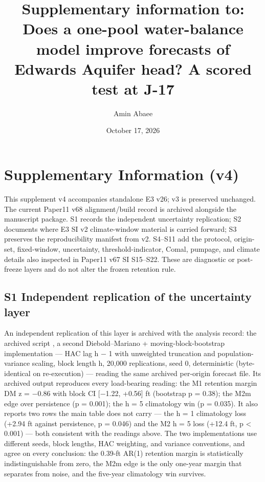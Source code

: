 \documentclass[11pt]{article}
\title{Supplementary information to: Does a one-pool water-balance model improve forecasts of Edwards Aquifer head? A scored test at J-17}
\author{Amin Abaee}
\date{October 17, 2026}
\begin{document}
\maketitle

\section*{Supplementary Information (v4)}

This supplement v4 accompanies standalone E3 v26; v3 is preserved unchanged. The current Paper11 v68 alignment/build record is archived alongside the manuscript package. S1 records the independent uncertainty replication; S2 documents where E3 SI v2 climate-window material is carried forward; S3 preserves the reproducibility manifest from v2. S4--S11 add the protocol, origin-set, fixed-window, uncertainty, threshold-indicator, Comal, pumpage, and climate details also inspected in Paper11 v67 SI S15--S22. These are diagnostic or post-freeze layers and do not alter the frozen retention rule.

\subsection{S1 Independent replication of the uncertainty
layer}\label{s1-independent-replication-of-the-uncertainty-layer}

An independent replication of this layer is archived with the
analysis record: the archived script
, a second Diebold--Mariano +
moving-block-bootstrap implementation --- HAC lag h − 1 with unweighted
truncation and population-variance scaling, block length h, 20,000
replications, seed 0, deterministic (byte-identical on re-execution) ---
reading the same archived per-origin forecast file. Its archived
output reproduces every load-bearing reading:
the M1 retention margin DM z = −0.86 with block CI {[}−1.22, +0.56{]} ft
(bootstrap p = 0.38); the M2m edge over persistence (p = 0.001); the h =
5 climatology win (p = 0.035). It also reports two rows the main table
does not carry --- the h = 1 climatology loss (+2.94 ft against
persistence, p = 0.046) and the M2 h = 5 loss (+12.4 ft, p \textless{}
0.001) --- both consistent with the readings above. The two
implementations use different seeds, block lengths, HAC weighting, and
variance conventions, and agree on every conclusion: the 0.39-ft AR(1)
retention margin is statistically indistinguishable from zero, the M2m
edge is the only one-year margin that separates from noise, and the
five-year climatology win survives.
\end{document}
